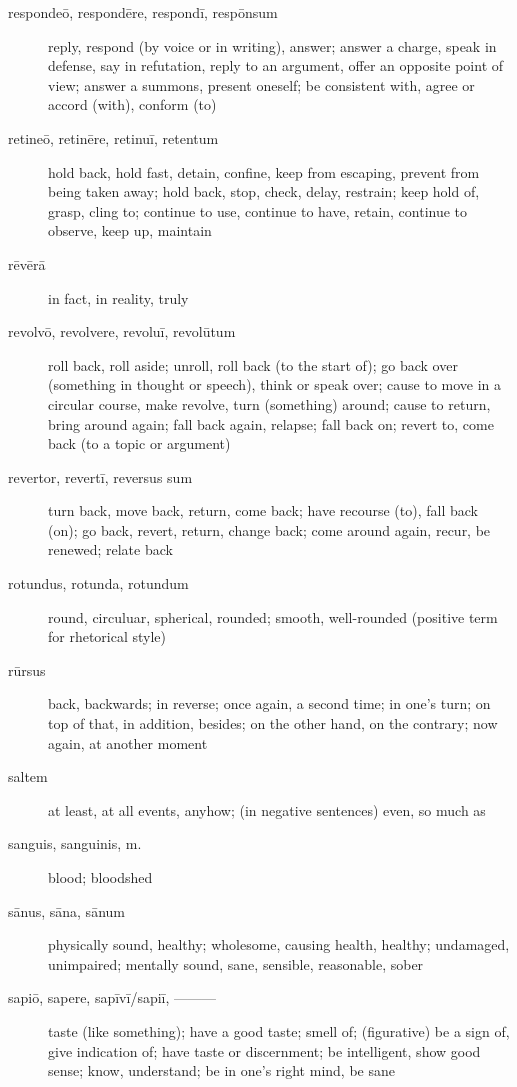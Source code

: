 \begin{description}
    \item[respondeō, respondēre, respondī, respōnsum] \marginnote{*}reply, respond (by voice or in writing), answer; answer a charge, speak in defense, say in refutation, reply to an argument, offer an opposite point of view; answer a summons, present oneself; be consistent with, agree or accord (with), conform (to)
    \item[retineō, retinēre, retinuī, retentum] \marginnote{*}hold back, hold fast, detain, confine, keep from escaping, prevent from being taken away; hold back, stop, check, delay, restrain; keep hold of, grasp, cling to; continue to use, continue to have, retain, continue to observe, keep up, maintain
    \item[rēvērā] \marginnote{*}in fact, in reality, truly
    \item[revolvō, revolvere, revoluī, revolūtum] roll back, roll aside; unroll, roll back (to the start of); go back over (something in thought or speech), think or speak over; cause to move in a circular course, make revolve, turn (something) around; cause to return, bring around again; fall back again, relapse; fall back on; revert to, come back (to a topic or argument)
    \item[revertor, revertī, reversus sum] turn back, move back, return, come back; have recourse (to), fall back (on); go back, revert, return, change back; come around again, recur, be renewed; relate back
    \item[rotundus, rotunda, rotundum] round, circuluar, spherical, rounded; smooth, well-rounded (positive term for rhetorical style)
    \item[rūrsus] \marginnote{*}back, backwards; in reverse; once again, a second time; in one's turn; on top of that, in addition, besides; on the other hand, on the contrary; now again, at another moment
    \item[saltem] at least, at all events, anyhow; (in negative sentences) even, so much as
    \item[sanguis, sanguinis, m.] \marginnote{*}blood; bloodshed
    \item[sānus, sāna, sānum] \marginnote{*}physically sound, healthy; wholesome, causing health, healthy; undamaged, unimpaired; mentally sound, sane, sensible, reasonable, sober
    \item[sapiō, sapere, sapīvī/sapiī, ———] taste (like something); have a good taste; smell of; (figurative) be a sign of, give indication of; have taste or discernment; be intelligent, show good sense; know, understand; be in one's right mind, be sane

\end{description}
